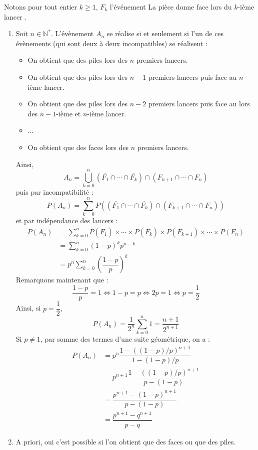 \documentclass[a4paper,10pt]{report}
\begin{document}
\corr Notons pour tout entier $k \geq 1$, $F_k$ l'événement \og La pièce donne face lors du $k$-ième lancer \fg .

\begin{enumerate}
\item Soit $n \in \mathbb{N}^*$. L'évènement $A_n$ se réalise si et seulement si l'un de ces évènements (qui sont deux à deux incompatibles) se réalisent :
\begin{itemize}
\item On obtient que des piles lors des $n$ premiers lancers.
\item On obtient que des piles lors des $n-1$ premiers lancers puis face au $n$-ième lancer.
\item On obtient que des piles lors des $n-2$ premiers lancers puis face au lors des $n-1$-ième et $n$-ième lancer.
\item $\ldots$
\item On obtient que des faces lors des $n$ premiers lancers.
\end{itemize}
Ainsi,
$$ A_n =\bigcup_{k=0}^n (\overline{F_1} \cap \cdots \cap \overline{F_k}) \cap (F_{k+1} \cap \cdots \cap F_n)$$
puis par incompatibilité :
$$ P(A_n) = \sum_{k=0}^n P( (\overline{F_1} \cap \cdots \cap \overline{F_k}) \cap (F_{k+1} \cap \cdots \cap F_n))$$
et par indépendance des lancers :
\begin{align*}
 P(A_n) & = \sum_{k=0}^n P(\overline{F_1}) \times \cdots \times P(\overline{F_k}) \times P(F_{k+1}) \times \cdots \times P( F_n) \\
 & = \sum_{k=0}^n  (1-p)^k p^{n-k} \\
 & = p^{n} \sum_{k=0}^n \left( \dfrac{1-p}{p} \right)^k 
 \end{align*}
Remarquons maintenant que :
$$\dfrac{1-p}{p} = 1 \Longleftrightarrow 1-p=p \Longleftrightarrow 2p=1 \Longleftrightarrow p = \dfrac{1}{2}$$
Ainsi, si $p = \dfrac{1}{2}$,
$$ P(A_n) = \dfrac{1}{2^{n}} \sum_{k=0}^n 1 = \dfrac{n+1}{2^{n+1}}$$
Si $p \neq 1$, par somme des termes d'une suite géométrique, on a :
\begin{align*}
P(A_n) & = p^n \dfrac{1-((1-p)/p)^{n+1}}{1-(1-p)/p} \\
& = p^{n+1} \dfrac{1-((1-p)/p)^{n+1}}{p-(1-p)} \\
& = \dfrac{p^{n+1}-(1-p)^{n+1}}{p-(1-p)} \\
& = \dfrac{p^{n+1}-q^{n+1}}{p-q}
\end{align*}
\item A priori, oui c'est possible si l'on obtient que des faces ou que des piles. 


\end{enumerate}
\end{document}
